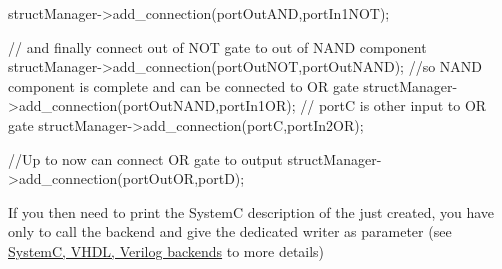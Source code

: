\begin{DoxyCode}
structManager->add\_connection(portOutAND,portIn1NOT);

\textcolor{comment}{// and finally connect out of NOT gate to out of NAND component}
structManager->add\_connection(portOutNOT,portOutNAND);
\textcolor{comment}{//so NAND component is complete and can be connected to OR gate}
structManager->add\_connection(portOutNAND,portIn1OR);
\textcolor{comment}{// portC is other input to OR gate}
structManager->add\_connection(portC,portIn2OR);

\textcolor{comment}{//Up to now can connect OR gate to output}
structManager->add\_connection(portOutOR,portD);
\end{DoxyCode}


If you then need to print the SystemC description of the just created, you have only to call the backend and give the dedicated writer as parameter (see \hyperlink{src_backend_ToHDL_page}{SystemC, V\+H\+DL, Verilog backends} to more details)

